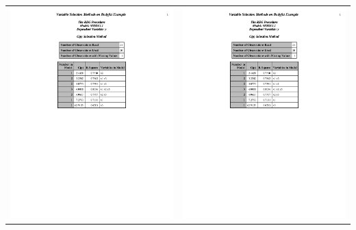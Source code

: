 \begin{center}
\begin{tabular}{cc}
\includegraphics[page=3,scale=0.6,trim=40mm 30mm 20mm 10mm]{bodyfatexampleselection}&
\includegraphics[page=4,scale=0.6,trim=40mm 30mm 20mm 10mm]{bodyfatexampleselection}\\

\end{tabular}
\end{center}
